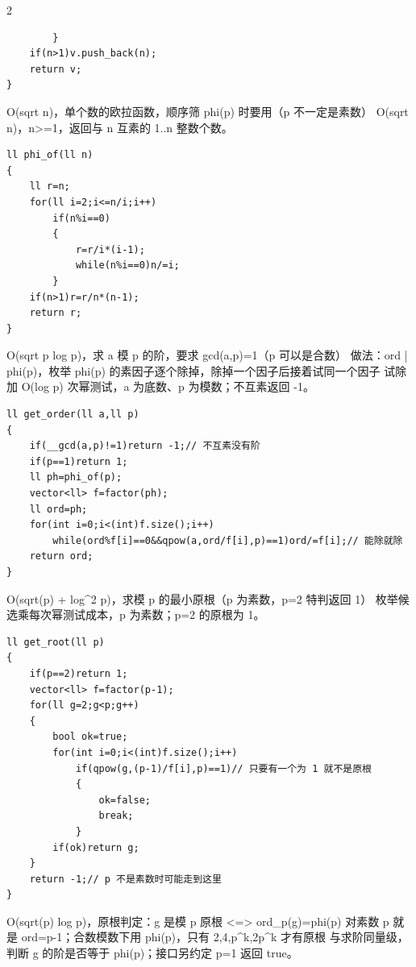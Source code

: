 \documentclass[UTF8,fontset=fandol,a4paper,twoside]{ctexart}
\newcommand{\note}[1]{{\fontsize{10}{12}\selectfont #1\par}}
\begin{document}
\begin{multicols}{2}
\begin{lstlisting}
        }
    if(n>1)v.push_back(n);
    return v;
}
\end{lstlisting}
\note{O(\allowbreak{}sqrt n)\allowbreak{}，单个数的欧拉函数，顺序筛 phi(\allowbreak{}p)\allowbreak{} 时要用（p 不一定是素数） O(\allowbreak{}sqrt n)\allowbreak{}，n>\allowbreak{}=\allowbreak{}1，返回与 n 互素的 1.\allowbreak{}.\allowbreak{}n 整数个数。}
\begin{lstlisting}
ll phi_of(ll n)
{
    ll r=n;
    for(ll i=2;i<=n/i;i++)
        if(n%i==0)
        {
            r=r/i*(i-1);
            while(n%i==0)n/=i;
        }
    if(n>1)r=r/n*(n-1);
    return r;
}
\end{lstlisting}
\note{O(\allowbreak{}sqrt p log p)\allowbreak{}，求 a 模 p 的阶，要求 gcd(\allowbreak{}a,\allowbreak{}p)\allowbreak{}=\allowbreak{}1（p 可以是合数） 做法：ord | phi(\allowbreak{}p)\allowbreak{}，枚举 phi(\allowbreak{}p)\allowbreak{} 的素因子逐个除掉，除掉一个因子后接着试同一个因子 试除加 O(\allowbreak{}log p)\allowbreak{} 次幂测试，a 为底数、p 为模数；不互素返回 -\allowbreak{}1。}
\begin{lstlisting}
ll get_order(ll a,ll p)
{
    if(__gcd(a,p)!=1)return -1;// 不互素没有阶
    if(p==1)return 1;
    ll ph=phi_of(p);
    vector<ll> f=factor(ph);
    ll ord=ph;
    for(int i=0;i<(int)f.size();i++)
        while(ord%f[i]==0&&qpow(a,ord/f[i],p)==1)ord/=f[i];// 能除就除
    return ord;
}
\end{lstlisting}
\note{O(\allowbreak{}sqrt(\allowbreak{}p)\allowbreak{} +\allowbreak{} log\textasciicircum{}2 p)\allowbreak{}，求模 p 的最小原根（p 为素数，p=\allowbreak{}2 特判返回 1） 枚举候选乘每次幂测试成本，p 为素数；p=\allowbreak{}2 的原根为 1。}
\begin{lstlisting}
ll get_root(ll p)
{
    if(p==2)return 1;
    vector<ll> f=factor(p-1);
    for(ll g=2;g<p;g++)
    {
        bool ok=true;
        for(int i=0;i<(int)f.size();i++)
            if(qpow(g,(p-1)/f[i],p)==1)// 只要有一个为 1 就不是原根
            {
                ok=false;
                break;
            }
        if(ok)return g;
    }
    return -1;// p 不是素数时可能走到这里
}
\end{lstlisting}
\note{O(\allowbreak{}sqrt(\allowbreak{}p)\allowbreak{} log p)\allowbreak{}，原根判定：g 是模 p 原根 <\allowbreak{}=\allowbreak{}>\allowbreak{} ord\_p(\allowbreak{}g)\allowbreak{}=\allowbreak{}phi(\allowbreak{}p)\allowbreak{} 对素数 p 就是 ord=\allowbreak{}p-\allowbreak{}1；合数模数下用 phi(\allowbreak{}p)\allowbreak{}，只有 2,\allowbreak{}4,\allowbreak{}p\textasciicircum{}k,\allowbreak{}2p\textasciicircum{}k 才有原根 与求阶同量级，判断 g 的阶是否等于 phi(\allowbreak{}p)\allowbreak{}；接口另约定 p=\allowbreak{}1 返回 true。}

\end{multicols}
\end{document}
